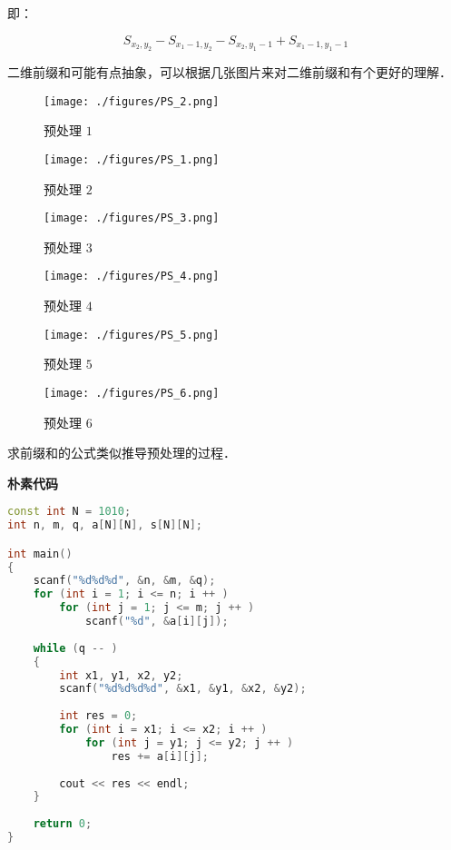 即：

\begin{equation}
S_{x_2, y_2} - S_{x_1 - 1, y_2} - S_{x_2, y_1 - 1} + S_{x_1 - 1, y_1 - 1}
\end{equation}

二维前缀和可能有点抽象，可以根据几张图片来对二维前缀和有个更好的理解．

\begin{figure}[ht]
\centering
\texttt{[image: ./figures/PS\_2.png]}
\caption{预处理 $1$} \label{PS_fig2}
\end{figure}


\begin{figure}[ht]
\centering
\texttt{[image: ./figures/PS\_1.png]}
\caption{预处理 $2$ } \label{PS_fig1}
\end{figure}

\begin{figure}[ht]
\centering
\texttt{[image: ./figures/PS\_3.png]}
\caption{预处理 $3$} \label{PS_fig3}
\end{figure}

\begin{figure}[ht]
\centering
\texttt{[image: ./figures/PS\_4.png]}
\caption{预处理 $4$} \label{PS_fig4}
\end{figure}

\begin{figure}[ht]
\centering
\texttt{[image: ./figures/PS\_5.png]}
\caption{预处理 $5$} \label{PS_fig5}
\end{figure}

\begin{figure}[ht]
\centering
\texttt{[image: ./figures/PS\_6.png]}
\caption{预处理 $6$} \label{PS_fig6}
\end{figure}

求前缀和的公式类似推导预处理的过程．

\textbf{朴素代码}

\begin{lstlisting}[language=cpp]
const int N = 1010;
int n, m, q, a[N][N], s[N][N];

int main()
{
    scanf("%d%d%d", &n, &m, &q);
    for (int i = 1; i <= n; i ++ )
        for (int j = 1; j <= m; j ++ )
            scanf("%d", &a[i][j]);
    
    while (q -- ) 
    {
        int x1, y1, x2, y2;
        scanf("%d%d%d%d", &x1, &y1, &x2, &y2);
        
        int res = 0;
        for (int i = x1; i <= x2; i ++ )
            for (int j = y1; j <= y2; j ++ )
                res += a[i][j];
        
        cout << res << endl;
    }
    
    return 0;
}
\end{lstlisting}

